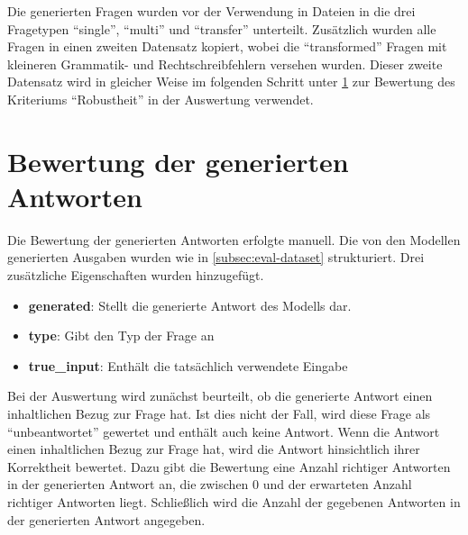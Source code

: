 Die generierten Fragen wurden vor der Verwendung in Dateien in die drei Fragetypen \enquote{single}, \enquote{multi} und \enquote{transfer} unterteilt.
Zusätzlich wurden alle Fragen in einen zweiten Datensatz kopiert, wobei die \enquote{transformed} Fragen mit kleineren Grammatik- und Rechtschreibfehlern versehen wurden.
Dieser zweite Datensatz wird in gleicher Weise im folgenden Schritt unter \cref{sec:answer-rating} zur Bewertung des Kriteriums \enquote{Robustheit} in der Auswertung verwendet.

\section{Bewertung der generierten Antworten}\label{sec:answer-rating}
Die Bewertung der generierten Antworten erfolgte manuell.
Die von den Modellen generierten Ausgaben wurden wie in \cref{subsec:eval-dataset} strukturiert. Drei zusätzliche Eigenschaften wurden hinzugefügt.
\begin{itemize}
    \item \textbf{generated}: Stellt die generierte Antwort des Modells dar.
    \item \textbf{type}: Gibt den Typ der Frage an
    \item \textbf{true\_input}: Enthält die tatsächlich verwendete Eingabe
\end{itemize}

Bei der Auswertung wird zunächst beurteilt, ob die generierte Antwort einen inhaltlichen Bezug zur Frage hat.
Ist dies nicht der Fall, wird diese Frage als \enquote{unbeantwortet} gewertet und enthält auch keine Antwort.
Wenn die Antwort einen inhaltlichen Bezug zur Frage hat, wird die Antwort hinsichtlich ihrer Korrektheit bewertet.
Dazu gibt die Bewertung eine Anzahl richtiger Antworten in der generierten Antwort an, die zwischen 0 und der erwarteten Anzahl richtiger Antworten liegt.
Schließlich wird die Anzahl der gegebenen Antworten in der generierten Antwort angegeben.\\

